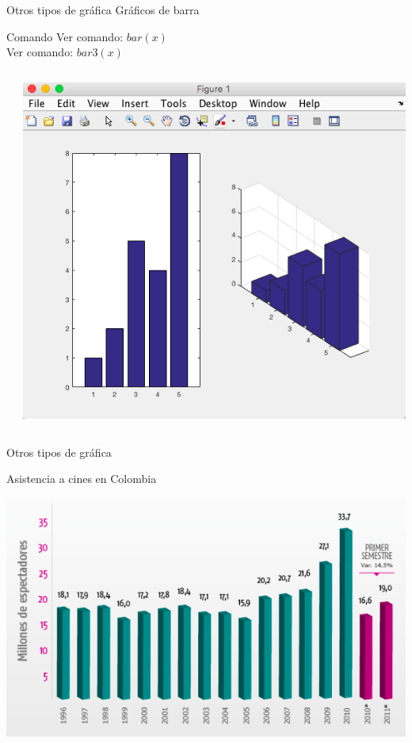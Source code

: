 \documentclass{bredelebeamer}
\begin{document}
\begin{frame}{Otros tipos de gráfica}
Gráficos de barra
\begin{exampleblock}{Comando}
Ver comando: \textbf{$bar(x)$}\\
Ver comando: \textbf{$bar3(x)$}\\
\end{exampleblock}
\begin{columns}
\begin{column}{0.5\textwidth}

\end{column}
\begin{column}{0.5\textwidth}
\begin{center}
\includegraphics[scale=0.2]{images/pantalla24.png}
\end{center}
\end{column}
\end{columns}
\end{frame}

\begin{frame}{Otros tipos de gráfica}
\begin{center}
Asistencia a cines en Colombia
\end{center}
\begin{center}
\includegraphics[scale=0.5]{images/img42.png}
\end{center}
\end{frame}
\end{document}
